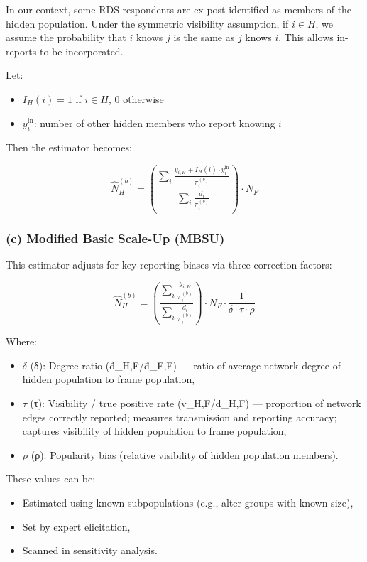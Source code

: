 \documentclass[
  12pt,
  letterpaper,
  DIV=11,
  numbers=noendperiod]{scrartcl}
\theoremstyle{plain}
\theoremstyle{definition}
\begin{document}
In our context, some RDS respondents are ex post identified as members
of the hidden population. Under the symmetric visibility assumption, if
\(i \in H\), we assume the probability that \(i\) knows \(j\) is the
same as \(j\) knows \(i\). This allows in-reports to be incorporated.

Let:

\begin{itemize}
\item
  \(I_H(i) = 1\) if \(i \in H\), 0 otherwise
\item
  \(y_{i}^{\text{in}}\): number of other hidden members who report
  knowing \(i\)
\end{itemize}

Then the estimator becomes:

\[\hat{N}_H^{(b)} = \left( \frac{\sum_{i} \frac{y_{i,H} + I_H(i) \cdot y_{i}^{\text{in}}}{\pi_i^{(b)}}}{\sum_{i} \frac{d_i}{\pi_i^{(b)}}} \right) \cdot N_F\]

\subsubsection{(c) Modified Basic Scale-Up
(MBSU)}\label{c-modified-basic-scale-up-mbsu}

This estimator adjusts for key reporting biases via three correction
factors:

\[\hat{N}_H^{(b)} = \left( \frac{\sum_{i} \frac{y_{i,H}}{\pi_i^{(b)}}}{\sum_{i} \frac{d_i}{\pi_i^{(b)}}} \right) \cdot N_F \cdot \frac{1}{\delta \cdot \tau \cdot \rho}\]

Where:

\begin{itemize}
\item
  \(\delta\) (δ): Degree ratio (d̄\_H,F/d̄\_F,F) --- ratio of average
  network degree of hidden population to frame population,
\item
  \(\tau\) (τ): Visibility / true positive rate (v̄\_H,F/d̄\_H,F) ---
  proportion of network edges correctly reported; measures transmission
  and reporting accuracy; captures visibility of hidden population to
  frame population,
\item
  \(\rho\) (ρ): Popularity bias (relative visibility of hidden
  population members).
\end{itemize}

These values can be:

\begin{itemize}
\item
  Estimated using known subpopulations (e.g., alter groups with known
  size),
\item
  Set by expert elicitation,
\item
  Scanned in sensitivity analysis.
\end{itemize}
\end{document}
